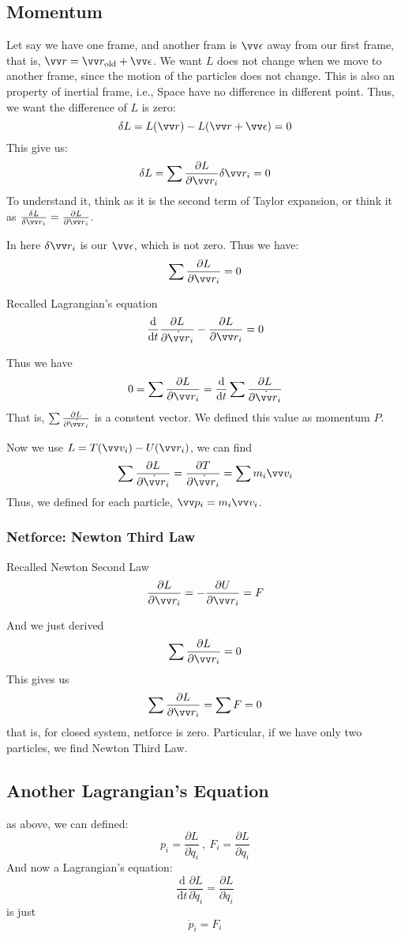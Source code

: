 \documentclass{article}
\newcommand{\de}{\mathrm{d}}
\begin{document}
\subsection{Momentum}
Let say we have one frame, and another fram is $\vv \epsilon$ away from our first frame, that is, $\vv r= \vv r_\text{old} + \vv \epsilon$. We want $L$ does not change when we move to another frame, since the motion of the particles does not change. This is also an property of inertial frame, i.e., Space have no difference in different point. Thus, we want the difference of $L$ is zero:
\[
\delta L = L(\vv r) - L(\vv r + \vv \epsilon) = 0
\]
This give us:
\[
\delta L = \sum \frac{\partial L}{\partial \vv r_i} \delta \vv r_i  = 0
\]
To understand it, think as it is the second term of Taylor expansion, or think it as $\frac{\delta L}{\delta \vv r_i} = \frac{\partial L}{\partial \vv r_i}$.

In here $\delta \vv r_i$ is our $\vv \epsilon$, which is not zero. Thus we have:
\[
\sum \frac{\partial L}{\partial \vv r_i} = 0
\]

Recalled Lagrangian's equation
\[
\frac{\de}{\de t} \frac{\partial L}{\partial \dot{\vv r}_i} - \frac{\partial L}{\partial \vv r_i} = 0
\]

Thus we have
\[
0 = \sum \frac{\partial L}{\partial \vv r_i} = \frac{\de}{\de t} \sum\frac{\partial L}{\partial \dot{\vv r}_i} 
\]
That is, $\sum\frac{\partial L}{\partial \dot{\vv r}_i}$ is a constent vector. We defined this value as momentum $P$.

Now we use $L = T(\vv v_i) - U(\vv r_i)$, we can find
\[
\sum \frac{\partial L}{\partial \dot{\vv r}_i} = \frac{\partial T}{\partial \dot{\vv r}_i} = \sum m_i\vv v_i
\]
Thus, we defined for each particle, $\vv p_i = m_i\vv v_i$.

\subsubsection{Netforce: Newton Third Law}
Recalled Newton Second Law
\[
\frac{\partial L}{\partial \vv r_i} = -\frac{\partial U}{\partial \vv r_i} = F
\]

And we just derived
\[
\sum \frac{\partial L}{\partial \vv r_i} = 0
\]
This gives us
\[
\sum \frac{\partial L}{\partial \vv r_i} = \sum F = 0
\]
that is, for closed system, netforce is zero. Particular, if we have only two particles, we find Newton Third Law.

\subsection{Another Lagrangian's Equation}
as above, we can defined:
\[
p_i = \frac{\partial L}{\partial \dot q_i} \ , \  F_i = \frac{\partial L}{\partial q_i}
\]
And now a Lagrangian's equation:
\[
\frac{\de}{\de t} \frac{\partial L}{\partial \dot{q}_i} = \frac{\partial L}{\partial q_i} 
\]
is just
\[
\dot p_i = F_i
\]















\end{document}
